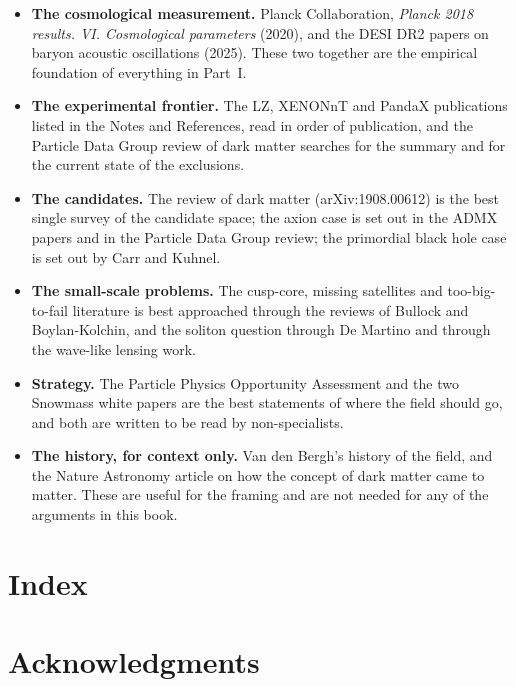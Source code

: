 \begin{itemize}
\item \textbf{The cosmological measurement.} Planck Collaboration,
\emph{Planck 2018 results. VI. Cosmological parameters} (2020), and the
DESI DR2 papers on baryon acoustic oscillations (2025). These two together
are the empirical foundation of everything in Part~I.
\item \textbf{The experimental frontier.} The LZ, XENONnT and PandaX
publications listed in the Notes and References, read in order of
publication, and the Particle Data Group review of dark matter searches for
the summary and for the current state of the exclusions.
\item \textbf{The candidates.} The review of dark matter (arXiv:1908.00612)
is the best single survey of the candidate space; the axion case is set out
in the ADMX papers and in the Particle Data Group review; the primordial
black hole case is set out by Carr and Kuhnel.
\item \textbf{The small-scale problems.} The cusp-core, missing satellites
and too-big-to-fail literature is best approached through the reviews of
Bullock and Boylan-Kolchin, and the soliton question through De Martino and
through the wave-like lensing work.
\item \textbf{Strategy.} The Particle Physics Opportunity Assessment and the
two Snowmass white papers are the best statements of where the field should
go, and both are written to be read by non-specialists.
\item \textbf{The history, for context only.} Van den Bergh's history of the
field, and the Nature Astronomy article on how the concept of dark matter
came to matter. These are useful for the framing and are not needed for any
of the arguments in this book.
\end{itemize}

\chapter*{Index}
\thispagestyle{plain}
\printindex

\chapter*{Acknowledgments}
\thispagestyle{plain}

